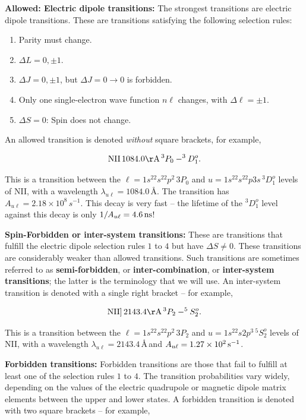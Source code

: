 \documentclass[a4paper,10pt]{article}
\begin{document}
{\noindent}\textbf{Allowed: Electric dipole transitions:} The strongest transitions are electric dipole transitions. These are transitions satisfying the following selection rules:

\newpage
\begin{enumerate}
    \item Parity must change.
    \item $\Delta L = 0, \pm1$.
    \item $\Delta J = 0, \pm1$, but $\Delta J = 0\rightarrow0$ is forbidden.
    \item Only one single-electron wave function $n\ell$ changes, with $\Delta\ell=\pm1$.
    \item $\Delta S=0$: Spin does not change.
\end{enumerate}

{\noindent}An allowed transition is denoted \textit{without} square brackets, for example,

\begin{align*}
    {\rm NII}\,1084.0{\rm \AA}\,^3P_0-^3D_1^o.
\end{align*}

{\noindent}This is a transition between the $\ell=1s^22s^22p^2\,3P_0$ and $u=1s^22s^22p3s\,^3D_1^o$ levels of NII, with a wavelength $\lambda_{u\ell}=1084.0$\,\AA. The transition has $A_{u\ell}=2.18\times10^8\,{s^{-1}}$. This decay is very fast -- the lifetime of the $^3D_1^o$ level against this decay is only $1/A_{u\ell}=4.6\,{\rm ns}$!

{\noindent}\textbf{Spin-Forbidden or inter-system transitions:} These are transitions that fulfill the electric dipole selection rules $1$ to $4$ but have $\Delta S\neq0$. These transitions are considerably weaker than allowed transitions. Such transitions are sometimes referred to as \textbf{semi-forbidden}, or \textbf{inter-combination}, or \textbf{inter-system transitions}; the latter is the terminology that we will use. An inter-system transition is denoted with a single right bracket -- for example,

\begin{align*}
    {\rm NII]}\,2143.4{\rm \AA}\,^3P_2-^5S_2^o.
\end{align*}

{\noindent}This is a transition between the $\ell=1s^22s^22p^2\,3P_2$ and $u=1s^22s2p^3\,^5S_2^o$ levels of NII, with a wavelength $\lambda_{u\ell}=2143.4$\,\AA\,and $A_{u\ell}=1.27\times10^2\,{\rm s^{-1}}$.

{\noindent}\textbf{Forbidden transitions:} Forbidden transitions are those that fail to fulfill at least one of the selection rules $1$ to $4$. The transition probabilities vary widely, depending on the values of the electric quadrupole or magnetic dipole matrix elements between the upper and lower states. A forbidden transition is denoted with two square brackets -- for example,
\end{document}
